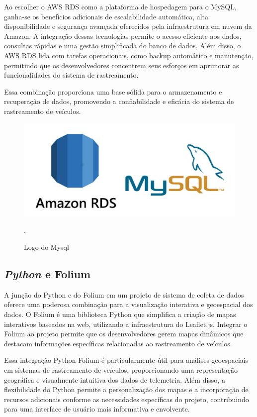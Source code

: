      Ao escolher o AWS RDS como a plataforma de hospedagem para o MySQL, ganha-se os benefícios adicionais de escalabilidade automática, alta disponibilidade e segurança avançada oferecidos pela infraestrutura em nuvem da Amazon. A integração dessas tecnologias permite o acesso eficiente aos dados, consultas rápidas e uma gestão simplificada do banco de dados. Além disso, o AWS RDS lida com tarefas operacionais, como backup automático e manutenção, permitindo que os desenvolvedores concentrem seus esforços em aprimorar as funcionalidades do sistema de rastreamento. 
     
     Essa combinação proporciona uma base sólida para o armazenamento e recuperação de dados, promovendo a confiabilidade e eficácia do sistema de rastreamento de veículos.

      \begin{figure}[hp]
    \centering
    
    \includegraphics[scale=0.4]{figures/logo_Mysql.jpg}
    
    \caption{Logo do Mysql}.
    
\end{figure}

    
     \subsection{\textit{Python} e Folium} A junção do Python e do Folium em um projeto de sistema de coleta de dados oferece uma poderosa combinação para a visualização interativa e geoespacial dos dados. O Folium é uma biblioteca Python que simplifica a criação de mapas interativos baseados na web, utilizando a infraestrutura do Leaflet.js. Integrar o Folium ao projeto permite que os desenvolvedores gerem mapas dinâmicos que destacam informações específicas relacionadas ao rastreamento de veículos.

    Essa integração Python-Folium é particularmente útil para análises geoespaciais em sistemas de rastreamento de veículos, proporcionando uma representação geográfica e visualmente intuitiva dos dados de telemetria. Além disso, a flexibilidade do Python permite a personalização dos mapas e a incorporação de recursos adicionais conforme as necessidades específicas do projeto, contribuindo para uma interface de usuário mais informativa e envolvente.

